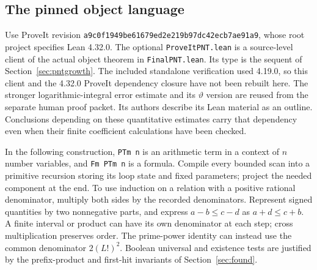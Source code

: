 \subsection{The pinned object language}
Use ProveIt revision \texttt{a9c0f1949be61679ed2e219b97dc42ecb7ae91a9}, whose root project specifies Lean 4.32.0. The optional \texttt{ProveItPNT.lean} is a source-level client of the actual object theorem in \texttt{FinalPNT.lean}. Its type is the sequent of Section~\ref{sec:pntgrowth}. The included standalone verification used 4.19.0, so this client and the 4.32.0 ProveIt dependency closure have not been rebuilt here. The stronger logarithmic-integral error estimate and its $\vartheta$ version are reused from the separate human proof packet. Its authors describe its Lean material as an outline. Conclusions depending on these quantitative estimates carry that dependency even when their finite coefficient calculations have been checked.

In the following construction, \texttt{PTm n} is an arithmetic term in a context of $n$ number variables, and \texttt{Fm PTm n} is a formula. Compile every bounded scan into a primitive recursion storing its loop state and fixed parameters; project the needed component at the end. To use induction on a relation with a positive rational denominator, multiply both sides by the recorded denominators. Represent signed quantities by two nonnegative parts, and express $a-b\le c-d$ as $a+d\le c+b$. A finite interval or product can have its own denominator at each step; cross multiplication preserves order. The prime-power identity can instead use the common denominator $2(L!)^2$. Boolean universal and existence tests are justified by the prefix-product and first-hit invariants of Section~\ref{sec:found}.

